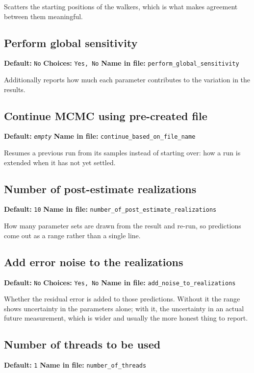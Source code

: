 \documentclass[11pt]{article}
\begin{document}
Scatters the starting positions of the walkers, which is what makes agreement between them meaningful.
\subsection{Perform global sensitivity}
{\small \textbf{Default:} \texttt{No} \quad\textbullet\quad \textbf{Choices:} \texttt{Yes, No} \quad\textbullet\quad \textbf{Name in file:} \texttt{perform\_\allowbreak{}global\_\allowbreak{}sensitivity}}

Additionally reports how much each parameter contributes to the variation in the results.
\subsection{Continue MCMC using pre-created file}
{\small \textbf{Default:} \texttt{\textit{empty}} \quad\textbullet\quad \textbf{Name in file:} \texttt{continue\_\allowbreak{}based\_\allowbreak{}on\_\allowbreak{}file\_\allowbreak{}name}}

Resumes a previous run from its samples instead of starting over: how a run is extended when it has not yet settled.
\subsection{Number of post-estimate realizations}
{\small \textbf{Default:} \texttt{10} \quad\textbullet\quad \textbf{Name in file:} \texttt{number\_\allowbreak{}of\_\allowbreak{}post\_\allowbreak{}estimate\_\allowbreak{}realizations}}

How many parameter sets are drawn from the result and re-run, so predictions come out as a range rather than a single line.
\subsection{Add error noise to the realizations}
{\small \textbf{Default:} \texttt{No} \quad\textbullet\quad \textbf{Choices:} \texttt{Yes, No} \quad\textbullet\quad \textbf{Name in file:} \texttt{add\_\allowbreak{}noise\_\allowbreak{}to\_\allowbreak{}realizations}}

Whether the residual error is added to those predictions. Without it the range shows uncertainty in the parameters alone; with it, the uncertainty in an actual future measurement, which is wider and usually the more honest thing to report.
\subsection{Number of threads to be used}
{\small \textbf{Default:} \texttt{1} \quad\textbullet\quad \textbf{Name in file:} \texttt{number\_\allowbreak{}of\_\allowbreak{}threads}}
\end{document}
